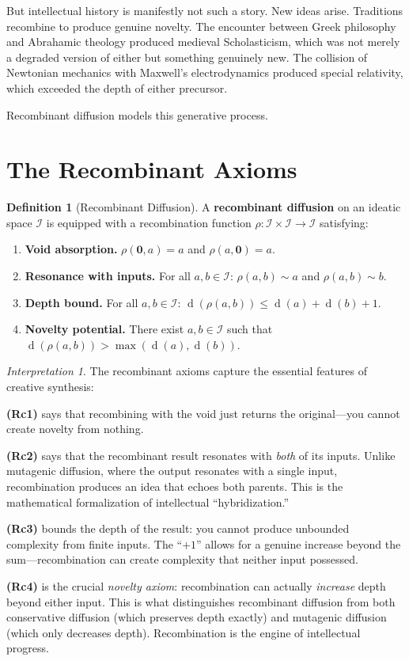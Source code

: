 \documentclass[11pt,openany]{book}
\theoremstyle{definition}
\newtheorem{definition}[axiom]{Definition}
\theoremstyle{plain}
\theoremstyle{remark}
\newtheorem{interpretation}[axiom]{Interpretation}
\newcommand{\IS}{\mathcal{I}}               %
\newcommand{\void}{\mathbf{0}}              %
\newcommand{\res}{\sim}                      %
\newcommand{\depth}{\operatorname{d}}       %
\begin{document}
But intellectual history is manifestly not such a story. New ideas arise. Traditions recombine to produce genuine novelty. The encounter between Greek philosophy and Abrahamic theology produced medieval Scholasticism, which was not merely a degraded version of either but something genuinely new. The collision of Newtonian mechanics with Maxwell's electrodynamics produced special relativity, which exceeded the depth of either precursor.

Recombinant diffusion models this generative process.

\section{The Recombinant Axioms}

\begin{definition}[Recombinant Diffusion]
\label{def:recombinant}
A \textbf{recombinant diffusion} on an ideatic space $\IS$ is equipped with a recombination function $\rho : \IS \times \IS \to \IS$ satisfying:
\begin{enumerate}
\item[\textbf{(Rc1)}] \textbf{Void absorption.} $\rho(\void, a) = a$ and $\rho(a, \void) = a$.
\item[\textbf{(Rc2)}] \textbf{Resonance with inputs.} For all $a, b \in \IS$: $\rho(a, b) \res a$ and $\rho(a, b) \res b$.
\item[\textbf{(Rc3)}] \textbf{Depth bound.} For all $a, b \in \IS$: $\depth(\rho(a, b)) \leq \depth(a) + \depth(b) + 1$.
\item[\textbf{(Rc4)}] \textbf{Novelty potential.} There exist $a, b \in \IS$ such that $\depth(\rho(a, b)) > \max(\depth(a), \depth(b))$.
\end{enumerate}
\end{definition}

\begin{interpretation}
The recombinant axioms capture the essential features of creative synthesis:

\textbf{(Rc1)} says that recombining with the void just returns the original---you cannot create novelty from nothing.

\textbf{(Rc2)} says that the recombinant result resonates with \emph{both} of its inputs. Unlike mutagenic diffusion, where the output resonates with a single input, recombination produces an idea that echoes both parents. This is the mathematical formalization of intellectual ``hybridization.''

\textbf{(Rc3)} bounds the depth of the result: you cannot produce unbounded complexity from finite inputs. The ``$+1$'' allows for a genuine increase beyond the sum---recombination can create complexity that neither input possessed.

\textbf{(Rc4)} is the crucial \emph{novelty axiom}: recombination can actually \emph{increase} depth beyond either input. This is what distinguishes recombinant diffusion from both conservative diffusion (which preserves depth exactly) and mutagenic diffusion (which only decreases depth). Recombination is the engine of intellectual progress.
\end{interpretation}
\end{document}
